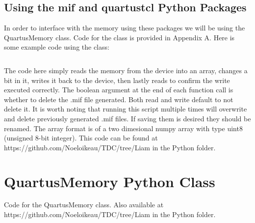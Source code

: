 \documentclass[letter,12pt]{article}
\begin{document}
\subsection{Using the mif and quartustcl Python Packages}

In order to interface with the memory using these packages we will be using the QuartusMemory class. Code for the class is provided in Appendix A. Here is some example code using the class:

\begin{mdframed}
\inputminted[linenos=true,breaklines,breakanywhere=true]{python}{../../Python/memoryExample.py}
\end{mdframed}

The code here simply reads the memory from the device into an array, changes a bit in it, writes it back to the device, then lastly reads to confirm the write executed correctly. The boolean argument at the end of each function call is whether to delete the .mif file generated. Both read and write default to not delete it. It is worth noting that running this script multiple times will overwrite and delete previously generated .mif files. If saving them is desired they should be renamed. The array format is of a two dimesional numpy array with type uint8 (unsigned 8-bit integer). 
This code can be found at https://github.com/Noeloikeau/TDC/tree/Liam in the Python folder.

\newpage
\appendix

\section{QuartusMemory Python Class}

Code for the QuartusMemory class. Also available at \\ https://github.com/Noeloikeau/TDC/tree/Liam in the Python folder.

\begin{mdframed}
\inputminted[linenos=true,breaklines,breakanywhere=true]{python}{../../Python/QuartusMemory.py}
\end{mdframed}
\end{document}
